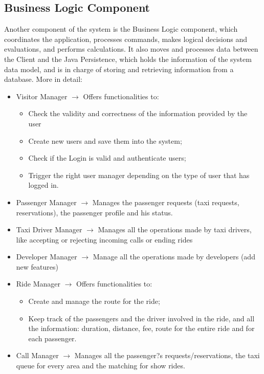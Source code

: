 \subsection{Business Logic Component}
Another component of the system is the Business Logic component, which coordinates the application, processes commands, makes logical decisions and evaluations, and performs calculations. It also moves and processes data between the Client and the Java Persistence, which holds the information of the system data model, and is in charge of storing and retrieving information from a database.
More in detail:
\begin{itemize}
	\item Visitor Manager $\rightarrow$ Offers functionalities to:
	\begin{itemize}
		\item Check the validity and correctness of the information provided by the user 
		\item Create new users and save them into the system;
		\item Check if the Login is valid and authenticate users;
		\item Trigger the right user manager depending on the type of user that has logged in.
	\end{itemize}
	\item Passenger Manager $\rightarrow$ Manages the passenger requests (taxi requests, reservations), the passenger profile and his status.
	\item Taxi Driver Manager $\rightarrow$ Manages all the operations made by taxi drivers, like accepting or rejecting incoming calls or ending rides
	\item Developer Manager $\rightarrow$ Manage all the operations made by developers (add new features)
	\item Ride Manager $\rightarrow$ Offers functionalities to:
	\begin{itemize}
		\item Create and manage the route for the ride;
		\item Keep track of the passengers and the driver involved in the ride, and all the information: duration, distance, fee, route for the entire ride and for each passenger.
	\end{itemize}
	\item Call Manager $\rightarrow$ Manages all the passenger?s requests/reservations, the taxi queue for every area and the matching for show rides.
\end{itemize}

